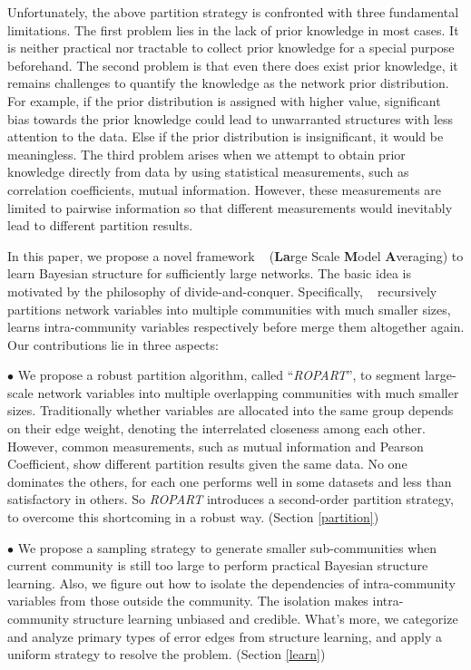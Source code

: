 Unfortunately, the above partition strategy is confronted with three fundamental limitations. The first problem lies in the lack of prior knowledge in most cases. It is neither practical nor tractable to collect prior knowledge for a special purpose beforehand. The second problem is that even there does exist prior knowledge, it remains challenges to quantify the knowledge as the network prior distribution. For example, if the prior distribution is assigned with higher value, significant bias towards the prior knowledge could lead to
unwarranted structures with less attention to the data.
Else if the prior distribution is insignificant, it would be meaningless. The third problem arises when we attempt to obtain prior knowledge directly from data by using statistical measurements, such as correlation coefficients\cite{Stuart+al:Science03}, mutual information\cite{DBLP:journals/bmcbi/MargolinNBWSFC06}. However, these measurements are limited to pairwise information so that different measurements would inevitably lead to different partition results.

In this paper, we propose a novel framework \lama~ (\textbf{La}rge Scale \textbf{M}odel \textbf{A}veraging) to learn Bayesian structure for sufficiently large networks.
The basic idea is motivated by the philosophy of divide-and-conquer. Specifically, \lama~ recursively partitions network variables into multiple communities with much smaller sizes, learns intra-community variables respectively before merge them altogether again. Our contributions lie in three aspects:

$\bullet$ We propose a robust partition algorithm, called ``\emph{ROPART}'', to segment large-scale network variables into multiple overlapping communities with much smaller sizes. Traditionally whether variables are allocated into the same group depends on their edge weight, denoting the interrelated closeness among each other. However, common measurements, such as mutual information\cite{DBLP:journals/bmcbi/MargolinNBWSFC06} and Pearson Coefficient\cite{Stuart+al:Science03}, show different partition results given the same data. No one dominates the others, for each one performs well in some datasets and less than
satisfactory in others. So \emph{ROPART} introduces a second-order partition strategy, to overcome this shortcoming in a robust way. (Section \ref{partition})

$\bullet$ We propose a sampling strategy to generate smaller sub-communities when current community is still too large to perform practical Bayesian structure learning. Also, we figure out how to isolate the dependencies of intra-community variables from those outside the community. The isolation makes intra-community structure learning unbiased and credible. What's more, we categorize and analyze primary types of error edges from structure learning, and apply a uniform strategy to resolve the problem. (Section \ref{learn})

